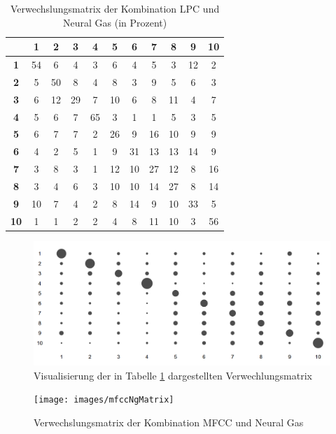 \begin{table}[h]
	\centering
	\begin{tabular}{c|cccccccccc}
		& \textbf{1} & \textbf{2} & \textbf{3} & \textbf{4} & \textbf{5} & \textbf{6} & \textbf{7} & \textbf{8} & \textbf{9} & \textbf{10} \\ \hline
		\textbf{1} & 54 & 6 & 4 & 3 & 6 & 4 & 5 & 3 & 12 & 2 \\
		\textbf{2} & 5 & 50 & 8 & 4 & 8 & 3 & 9 & 5 & 6 & 3 \\
		\textbf{3} & 6 & 12 & 29 & 7 & 10 & 6 & 8 & 11 & 4 & 7 \\
		\textbf{4} & 5 & 6 & 7 & 65 & 3 & 1 & 1 & 5 & 3 & 5 \\
		\textbf{5} & 6 & 7 & 7 & 2 & 26 & 9 & 16 & 10 & 9 & 9 \\
		\textbf{6} & 4 & 2 & 5 & 1 & 9 & 31 & 13 & 13 & 14 & 9 \\
		\textbf{7} & 3 & 8 & 3 & 1 & 12 & 10 & 27 & 12 & 8 & 16 \\
		\textbf{8} & 3 & 4 & 6 & 3 & 10 & 10 & 14 & 27 & 8 & 14 \\
		\textbf{9} & 10 & 7 & 4 & 2 & 8 & 14 & 9 & 10 & 33 & 5 \\
		\textbf{10} & 1 & 1 & 2 & 2 & 4 & 8 & 11 & 10 & 3 & 56 \\
	\end{tabular}
	\caption{Verwechslungsmatrix der Kombination LPC und Neural Gas (in Prozent)}
	\label{tbl:verwechslungsmatrix}
\end{table}

\begin{figure}[h]
  \centering
  \includegraphics[width=0.8\linewidth]{images/lpcNgMatrix}
  \caption{Visualisierung der in Tabelle \ref{tbl:verwechslungsmatrix} dargestellten Verwechlungsmatrix}
  \label{fig:verwechlsungsmatrixA}
\end{figure}

\begin{figure}[h]
  \centering
  \texttt{[image: images/mfccNgMatrix]}
  \caption{Verwechslungsmatrix der Kombination MFCC und Neural Gas}
  \label{fig:verwechslungsmatrixB}
\end{figure}


